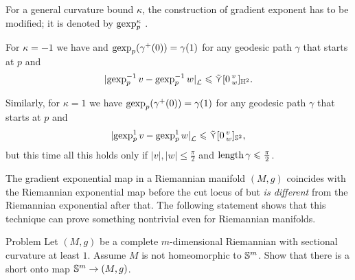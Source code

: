 For a general curvature bound $\kappa$, the construction of gradient exponent has to be modified;
it is denoted by $\operatorname{\rm gexp}\nolimits_p^\kappa$ \cite[16.36]{alexander-kapovitch-petrunin2024}.

For $\kappa=-1$ we have 
and $\operatorname{\rm gexp}\nolimits_p(\gamma^+(0))=\gamma(1)$
for any geodesic path $\gamma$ that starts at $p$
and 
\[|{\operatorname{\rm gexp}\nolimits_p^{-1}v}-{\operatorname{\rm gexp}\nolimits_p^{-1}w}|_{\mathcal{L}}^{{}}\leqslant \mathop{\tilde\curlyvee}\nolimits[0\,{}^{v}_{w}]_{\mathbb{H}^2}.\]

Similarly, for $\kappa=1$ we have $\operatorname{\rm gexp}\nolimits_p(\gamma^+(0))=\gamma(1)$
for any geodesic path $\gamma$ that starts at $p$ and 
\[|{\operatorname{\rm gexp}\nolimits_p^{1}v}-{\operatorname{\rm gexp}\nolimits_p^{1}w}|_{\mathcal{L}}^{{}}\leqslant \mathop{\tilde\curlyvee}\nolimits[0\,{}^{v}_{w}]_{\mathbb{S}^2},\]
but this time all this holds only if $|v|,|w|\le\tfrac\pi2$ and $\mathop{\rm length}\nolimits\gamma\leqslant\tfrac\pi2$.

The gradient exponential map in a Riemannian manifold $(M,g)$ coincides with the Riemannian exponential map before the cut locus of but \textit{is different} from the  Riemannian exponential after that.
The following statement shows that this technique can prove something nontrivial even for Riemannian manifolds.

\begin{thm}{Problem}
Let $(M,g)$ be a complete $m$-dimensional Riemannian with sectional curvature at least $1$.
Assume $M$ is not homeomorphic to $\mathbb{S}^m$.
Show that there is a short onto map $\mathbb{S}^m\to (M,g)$.
\end{thm}


